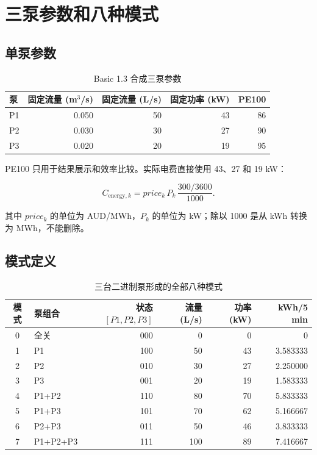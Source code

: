 \documentclass[UTF8,a4paper,11pt]{ctexart}
\begin{document}
\section{三泵参数和八种模式}

\subsection{单泵参数}

\begin{table}[htbp]
\centering
\caption{Basic 1.3 合成三泵参数}
\begin{tabular}{lrrrr}
\toprule
泵 & 固定流量 (m$^3$/s) & 固定流量 (L/s) & 固定功率 (kW) & PE100 \\
\midrule
P1 & 0.050 & 50 & 43 & 86 \\
P2 & 0.030 & 30 & 27 & 90 \\
P3 & 0.020 & 20 & 19 & 95 \\
\bottomrule
\end{tabular}
\end{table}

PE100 只用于结果展示和效率比较。实际电费直接使用 43、27 和 19 kW：

\begin{equation}
C_{\mathrm{energy},k}=price_k\,P_k\,\frac{300/3600}{1000}.
\end{equation}

其中 $price_k$ 的单位为 AUD/MWh，$P_k$ 的单位为 kW；除以 1000 是从 kWh 转换为 MWh，不能删除。

\subsection{模式定义}

\begin{table}[htbp]
\centering
\caption{三台二进制泵形成的全部八种模式}
\begin{tabular}{clrrrr}
\toprule
模式 & 泵组合 & 状态 $[P1,P2,P3]$ & 流量 (L/s) & 功率 (kW) & kWh/5 min \\
\midrule
0 & 全关 & 000 & 0 & 0 & 0 \\
1 & P1 & 100 & 50 & 43 & 3.583333 \\
2 & P2 & 010 & 30 & 27 & 2.250000 \\
3 & P3 & 001 & 20 & 19 & 1.583333 \\
4 & P1+P2 & 110 & 80 & 70 & 5.833333 \\
5 & P1+P3 & 101 & 70 & 62 & 5.166667 \\
6 & P2+P3 & 011 & 50 & 46 & 3.833333 \\
7 & P1+P2+P3 & 111 & 100 & 89 & 7.416667 \\
\bottomrule
\end{tabular}
\end{table}
\end{document}
